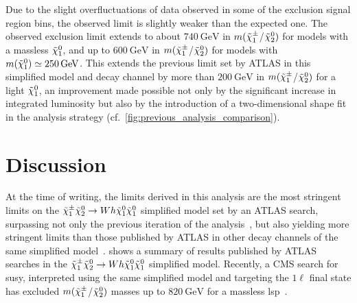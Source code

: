 Due to the slight overfluctuations of data observed in some of the exclusion signal region bins, the observed limit is slightly weaker than the expected one.
The observed exclusion limit extends to about $\SI{740}{\GeV}$ in \mbox{$m(\tilde{\chi}_1^\pm$/$\tilde{\chi}_2^0)$} for models with a massless $\tilde{\chi}_1^0$, and up to $\SI{600}{\GeV}$ in \mbox{$m(\tilde{\chi}_1^\pm$/$\tilde{\chi}_2^0)$} for models with $m(\lsp)\simeq\SI{250}{\GeV}$.
This extends the previous limit set by ATLAS in this simplified model and decay channel by more than $\SI{200}{\GeV}$ in \mbox{$m(\tilde{\chi}_1^\pm$/$\tilde{\chi}_2^0)$} for a light $\tilde{\chi}_1^0$, an improvement made possible not only by the significant increase in integrated luminosity but also by the introduction of a two-dimensional shape fit in the analysis strategy (cf.~\cref{fig:previous_analysis_comparison}). 

\section{Discussion}\label{sec:onelepton_discussion}

At the time of writing, the limits derived in this analysis are the most stringent limits on the $\tilde{\chi}_1^\pm\tilde{\chi}_2^0\rightarrow Wh\tilde{\chi}_1^0\tilde{\chi}_1^0$ simplified model set by an ATLAS search, surpassing not only the previous iteration of the analysis~\cite{SUSY-2017-01}, but also yielding more stringent limits than those published by ATLAS in other decay channels of the same simplified model~\cite{ATL-PHYS-PUB-2020-020}.
 shows a summary of results published by ATLAS searches in the $\tilde{\chi}_1^\pm\tilde{\chi}_2^0\rightarrow Wh\tilde{\chi}_1^0\tilde{\chi}_1^0$ simplified model.
Recently, a CMS search for \gls{susy}, interpreted using the same simplified model and targeting the $1\ell$ final state has excluded \mbox{$m(\tilde{\chi}_1^\pm$/$\tilde{\chi}_2^0)$} masses up to $\SI{820}{\GeV}$ for a massless \gls{lsp}~\cite{CMS-PAS-SUS-20-003}.

